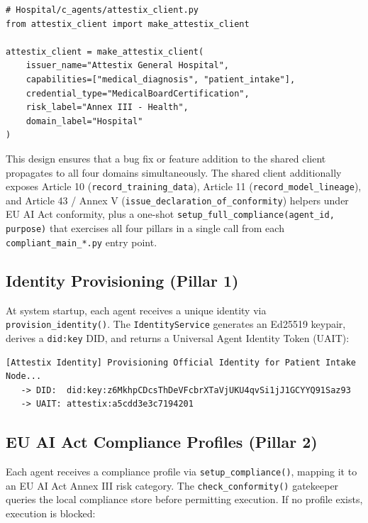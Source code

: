 \begin{lstlisting}[caption=Domain-specific client instantiation (Hospital)]
# Hospital/c_agents/attestix_client.py
from attestix_client import make_attestix_client

attestix_client = make_attestix_client(
    issuer_name="Attestix General Hospital",
    capabilities=["medical_diagnosis", "patient_intake"],
    credential_type="MedicalBoardCertification",
    risk_label="Annex III - Health",
    domain_label="Hospital"
)
\end{lstlisting}

This design ensures that a bug fix or feature addition to the shared client propagates to all four domains simultaneously. The shared client additionally exposes Article 10 (\texttt{record\_training\_data}), Article 11 (\texttt{record\_model\_lineage}), and Article 43 / Annex V (\texttt{issue\_declaration\_of\_conformity}) helpers under EU AI Act conformity, plus a one-shot \texttt{setup\_full\_compliance(agent\_id, purpose)} that exercises all four pillars in a single call from each \texttt{compliant\_main\_*.py} entry point.

\subsection{Identity Provisioning (Pillar 1)}

At system startup, each agent receives a unique identity via \texttt{provision\_identity()}. The \texttt{IdentityService} generates an Ed25519 keypair, derives a \texttt{did:key} DID, and returns a Universal Agent Identity Token (UAIT):

\begin{lstlisting}[caption=Identity provisioning output]
[Attestix Identity] Provisioning Official Identity for Patient Intake Node...
   -> DID:  did:key:z6MkhpCDcsThDeVFcbrXTaVjUKU4qvSi1jJ1GCYYQ91Saz93
   -> UAIT: attestix:a5cdd3e3c7194201
\end{lstlisting}

\subsection{EU AI Act Compliance Profiles (Pillar 2)}

Each agent receives a compliance profile via \texttt{setup\_compliance()}, mapping it to an EU AI Act Annex III risk category. The \texttt{check\_conformity()} gatekeeper queries the local compliance store before permitting execution. If no profile exists, execution is blocked:

